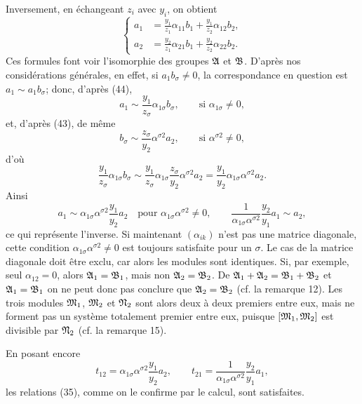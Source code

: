 Inversement, en échangeant $z_i$ avec $y_i$, on obtient
\begin{equation}
\left\{
\begin{aligned}
 a_1&=\frac{y_1}{z_1}\alpha_{11}b_1+\frac{y_1}{z_2}\alpha_{12}b_2,\\
 a_2&=\frac{y_2}{z_1}\alpha_{21}b_1+\frac{y_2}{z_2}\alpha_{22}b_2.
\end{aligned}\right.
\tag{44}
\end{equation}
Ces formules font voir l'isomorphie des groupes $\mathfrak{A}$ et $\mathfrak{B}$. D'après nos considérations générales, en effet, si $a_1b_\sigma\ne0$, la correspondance en question est $a_1\sim a_1b_\sigma$; donc, d'après (44),
\[
 a_1\sim\frac{y_1}{z_\sigma}\alpha_{1\sigma}b_\sigma,
 \qquad\text{si }\alpha_{1\sigma}\ne0,
\]
et, d'après (43), de même
\[
 b_\sigma\sim\frac{z_\sigma}{y_2}\alpha^{\sigma2}a_2,
 \qquad\text{si }\alpha^{\sigma2}\ne0,
\]
d'où
\[
 \frac{y_1}{z_\sigma}\alpha_{1\sigma}b_\sigma
 \sim
 \frac{y_1}{z_\sigma}\alpha_{1\sigma}\frac{z_\sigma}{y_2}\alpha^{\sigma2}a_2
 =\frac{y_1}{y_2}\alpha_{1\sigma}\alpha^{\sigma2}a_2.
\]
Ainsi
\[
 a_1\sim\alpha_{1\sigma}\alpha^{\sigma2}\frac{y_1}{y_2}a_2
 \quad\text{pour }\alpha_{1\sigma}\alpha^{\sigma2}\ne0,
 \qquad
 \frac{1}{\alpha_{1\sigma}\alpha^{\sigma2}}\frac{y_2}{y_1}a_1\sim a_2,
\]
ce qui représente l'inverse. Si maintenant $(\alpha_{ik})$ n'est pas une matrice diagonale, cette condition $\alpha_{1\sigma}\alpha^{\sigma2}\ne0$ est toujours satisfaite pour un $\sigma$. Le cas de la matrice diagonale doit être exclu, car alors les modules sont identiques. Si, par exemple, seul $\alpha_{12}=0$, alors $\mathfrak{A}_1=\mathfrak{B}_1$, mais non $\mathfrak{A}_2=\mathfrak{B}_2$. De $\mathfrak{A}_1+\mathfrak{A}_2=\mathfrak{B}_1+\mathfrak{B}_2$ et $\mathfrak{A}_1=\mathfrak{B}_1$ on ne peut donc pas conclure que $\mathfrak{A}_2=\mathfrak{B}_2$ (cf. la remarque 12). Les trois modules $\mathfrak{M}_1$, $\mathfrak{M}_2$ et $\mathfrak{N}_2$ sont alors deux à deux premiers entre eux, mais ne forment pas un système totalement premier entre eux, puisque $[\mathfrak{M}_1,\mathfrak{M}_2]$ est divisible par $\mathfrak{N}_2$ (cf. la remarque 15).

En posant encore
\[
 t_{12}=\alpha_{1\sigma}\alpha^{\sigma2}\frac{y_1}{y_2}a_2,
 \qquad
 t_{21}=\frac{1}{\alpha_{1\sigma}\alpha^{\sigma2}}\frac{y_2}{y_1}a_1,
\]
les relations (35), comme on le confirme par le calcul, sont satisfaites.

